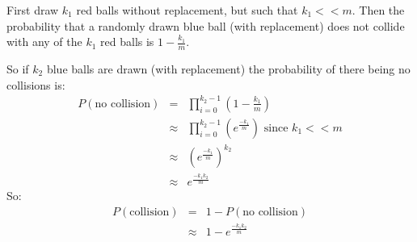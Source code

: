 First draw $k_1$ red balls without replacement, but such that $k_1 << m$. Then the probability that a randomly drawn blue ball (with replacement) does not collide with any of the $k_1$ red balls is $1-\frac{k_1}{m}$.

So if $k_2$ blue balls are drawn (with replacement) the probability of there being no collisions is: 
\begin{eqnarray*}
    P(\text{no collision}) &=& \prod_{i = 0}^{k_2 - 1}(1-\frac{k_1}{m})\\
    &\approx& \prod_{i = 0}^{k_2 - 1}(e^\frac{-k_1}{m}) \text{ since $k_1 << m$}\\
    &\approx& (e^\frac{-k_1}{m})^{k_2}\\
    &\approx& e^{\frac{-k_1 k_2}{m}}
\end{eqnarray*}
So:
\begin{eqnarray*}
    P(\text{collision}) &=& 1 - P(\text{no collision})\\
    &\approx& 1 - e^\frac{-k_1 k_2}{m}
\end{eqnarray*}
